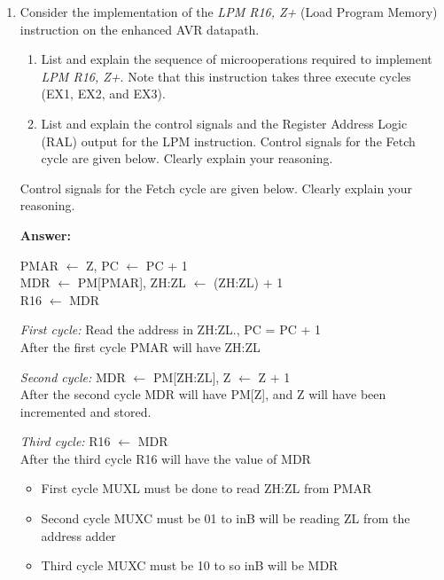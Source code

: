 \documentclass[12pt,letterpaper]{article}
\begin{document}
\begin{enumerate}
		\clearpage
		\item
			Consider the implementation of the \textit{LPM R16, Z+} (Load Program Memory) instruction on the enhanced AVR datapath. 
		
		\begin{enumerate}[a]
			\item
			List and explain the sequence of microoperations required to implement \textit{LPM R16, Z+}. 
			Note that this instruction takes three execute cycles (EX1, EX2, and EX3). 
			
			\item
			List and explain the control signals and the Register Address Logic (RAL) output for the LPM instruction.
			Control signals for the Fetch cycle are given below. Clearly explain your reasoning. 
		\end{enumerate}
		Control signals for the Fetch cycle are given below. Clearly explain your reasoning.
		
		\textbf{Answer:} 
		
		PMAR $\leftarrow$ Z, PC $\leftarrow$ PC + 1
		\\
		MDR $\leftarrow$ PM[PMAR], ZH:ZL $\leftarrow$ (ZH:ZL) + 1
		\\
		R16 $\leftarrow$ MDR
		
		
		\textit{First cycle:}  Read the address in ZH:ZL., PC = PC + 1
		\\
		After the first cycle PMAR will have ZH:ZL
		
		\textit{Second cycle:} MDR $\leftarrow$ PM[ZH:ZL], Z $\leftarrow$ Z + 1
		\\
		After the second cycle MDR will have PM[Z], and Z will have been incremented and stored.
		
		\textit{Third cycle:} R16 $\leftarrow$ MDR 
		\\
		After the third cycle R16 will have the value of MDR
		
		\begin{itemize}
			\item First cycle MUXL must be done to read ZH:ZL from PMAR
			\item Second cycle MUXC must be 01 to inB will be reading ZL from the address adder
			\item Third cycle MUXC must be 10 to so inB will be MDR
		\end{itemize}


\end{enumerate}
\end{document}
